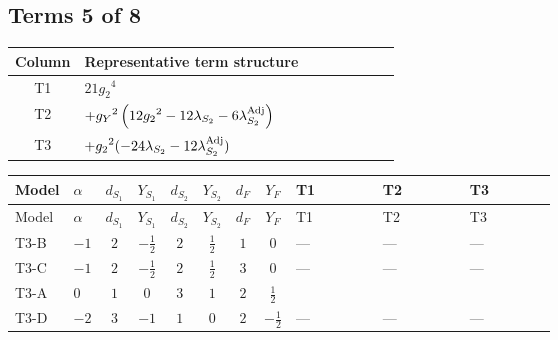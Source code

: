 \documentclass[8pt]{article}
\begin{document}
\begin{landscape}
\subsection*{Terms 5 of 8}
\begin{center}
\begin{tabular}{@{}c >{\raggedright\arraybackslash}p{0.82\linewidth}@{}}
\toprule
Column & Representative term structure \\
\midrule
T1 & \(\displaystyle 21 {g_2}^4\) \\
\midrule
T2 & \(\displaystyle +{g_Y}^2 \left(12 {g_2}^2-12 {\lambda_{S_2}}-6 {\lambda_{S_2}^{\rm Adj}}\right)\) \\
\midrule
T3 & \(\displaystyle +{g_2}^2 (-24 {\lambda_{S_2}}-12 {\lambda_{S_2}^{\rm Adj}})\) \\
\midrule
\bottomrule
\end{tabular}
\end{center}
\smallskip
\tiny
\begin{longtable}{@{}llcccccc >{\raggedright\arraybackslash}p{0.21\linewidth} >{\raggedright\arraybackslash}p{0.21\linewidth} >{\raggedright\arraybackslash}p{0.21\linewidth}@{}}
\toprule
Model & $\alpha$ & $d_{S_1}$ & $Y_{S_1}$ & $d_{S_2}$ & $Y_{S_2}$ & $d_F$ & $Y_F$ & T1 & T2 & T3 \\
\midrule
\endfirsthead
\toprule
Model & $\alpha$ & $d_{S_1}$ & $Y_{S_1}$ & $d_{S_2}$ & $Y_{S_2}$ & $d_F$ & $Y_F$ & T1 & T2 & T3 \\
\midrule
\endhead
T3-B & $-1$ & $2$ & $-\frac{1}{2}$ & $2$ & $\frac{1}{2}$ & $1$ & $0$ & --- & --- & --- \\
\midrule
T3-C & $-1$ & $2$ & $-\frac{1}{2}$ & $2$ & $\frac{1}{2}$ & $3$ & $0$ & --- & --- & --- \\
\midrule
T3-A & $0$ & $1$ & $0$ & $3$ & $1$ & $2$ & $\frac{1}{2}$ & \scriptsize\adjustbox{max width=\linewidth}{$\begin{gathered} 21 {g_2}^4\end{gathered}$} & \scriptsize\adjustbox{max width=\linewidth}{$\begin{gathered} +{g_Y}^2 \left(12 {g_2}^2-12 {\lambda_{S_2}}-6 {\lambda_{S_2}^{\rm Adj}}\right)\end{gathered}$} & \scriptsize\adjustbox{max width=\linewidth}{$\begin{gathered} +{g_2}^2 (-24 {\lambda_{S_2}}-12 {\lambda_{S_2}^{\rm Adj}})\end{gathered}$} \\
\midrule
T3-D & $-2$ & $3$ & $-1$ & $1$ & $0$ & $2$ & $-\frac{1}{2}$ & --- & --- & --- \\

\end{longtable}
\end{landscape}
\end{document}
